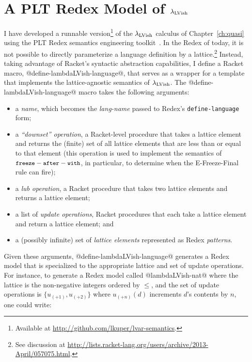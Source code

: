 \chapter{A PLT Redex Model of $\lambda_{\textrm{LVish}}$}\label{app:plt-redex}

I have developed a runnable version\footnote{Available at
  \url{http://github.com/lkuper/lvar-semantics}.} of the
$\lambda_{\textrm{LVish}}$ calculus of Chapter~\ref{ch:quasi} using the PLT Redex
semantics engineering toolkit~\cite{redex-book}.  In the Redex of
today, it is not possible to directly parameterize a language
definition by a lattice.\footnote{See discussion at
  \url{http://lists.racket-lang.org/users/archive/2013-April/057075.html}.}
Instead, taking advantage of Racket's syntactic abstraction
capabilities, I define a Racket macro, @define-lambdaLVish-language@,
that serves as a wrapper for a template that implements the
lattice-agnostic semantics of $\lambda_{\textrm{LVish}}$.  The
@define-lambdaLVish-language@ macro takes the following arguments:
\begin{itemize}
\item a \emph{name}, which becomes the \emph{lang-name} passed to
  Redex's \texttt{define-language} form;
\item a \emph{``downset'' operation}, a Racket-level procedure that
  takes a lattice element and returns the (finite) set of all lattice
  elements that are less than or equal to that element (this operation
  is used to implement the semantics of ${\mbox{\small{\texttt{freeze}}}-\mbox{\small{\texttt{after}}}-\mbox{\small{\texttt{with}}}}$, in particular, to
  determine when the {\sc E-Freeze-Final} rule can fire);
\item a \emph{lub operation}, a Racket procedure that takes two
  lattice elements and returns a lattice element;
\item a list of \emph{update operations}, Racket procedures that each
  take a lattice element and return a lattice element; and
\item a (possibly infinite) set of \emph{lattice elements} represented
  as Redex \emph{patterns}.
\end{itemize}

\noindent Given these arguments, @define-lambdaLVish-language@
generates a Redex model that is specialized to the appropriate lattice
and set of update operations. For instance, to generate a Redex model
called @lambdaLVish-nat@ where the lattice is the non-negative
integers ordered by $\leq$, and the set of update operations is $\{
u_{(+1)}, u_{(+2)} \}$ where $u_{(+n)}(d)$ increments $d$'s contents
by $n$, one could write:

